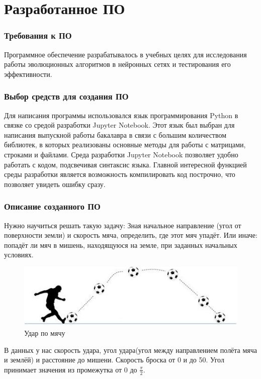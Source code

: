 \newpage

\chapter{Разработанное ПО}

\subsection{Требования к ПО}
Программное обеспечение разрабатывалось в учебных целях для исследования работы эволюционных алгоритмов в нейронных сетях и тестирования его эффективности.

\subsection{Выбор средств для создания ПО}

Для написания программы использовался язык программирования Python в связке со средой разработки Jupyter Notebook. Этот язык был выбран для написания выпускной работы бакалавра в связи с большим количеством библиотек, в которых реализованы основные методы для работы с матрицами, строками и файлами.
Среда разработки Jupyter Notebook позволяет удобно работать с кодом, подсвечивая синтаксис языка. Главной интересной функцией среды разработки является возможность компилировать код построчно, что позволяет увидеть ошибку сразу. 

\subsection{Описание созданного ПО}

Нужно научиться решать такую задачу:
Зная начальное направление (угол от поверхности земли) и скорость мяча, определить, где этот мяч упадёт. Или иначе: попадёт ли мяч в мишень, находящуюся на земле, при заданных начальных условиях.

\begin{figure}[h]
  \centering
  \includegraphics[width=0.5\linewidth]{./img/footbal}
  \caption{Удар по мячу}
  \label{fig:mpr} 
\end{figure} 

В данных у нас скорость удара, угол удара(угол между направлением полёта мяча и землёй) и расстояние до мишени. Скорость броска от 0 и до 50. Угол принимает значения из промежутка от 0 до $\frac{\pi}{2}$. 

